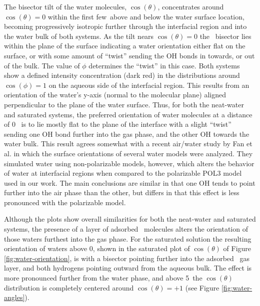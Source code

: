 \documentclass{article}
\begin{document}
The bisector tilt of the water molecules, $\cos(\theta)$, concentrates around $\cos(\theta)=0$ within the first few\angs~above and below the water surface location, becoming progressively isotropic further through the interfacial region and into the water bulk of both systems. As the tilt nears $\cos(\theta)=0$ the \wat~bisector lies within the plane of the surface indicating a water orientation either flat on the surface, or with some amount of ``twist'' sending the OH bonds in towards, or out of the bulk. The value of $\phi$ determines the ``twist'' in this case. Both systems show a defined intensity concentration (dark red) in the distributions around $\cos(\phi)=1$ on the aqueous side of the interfacial region. This results from an orientation of the water's y-axis (normal to the molecular plane) aligned perpendicular to the plane of the water surface. Thus, for both the neat-water and saturated systems, the preferred orientation of water molecules at a distance of 0\angs~ is to lie mostly flat to the plane of the interface with a slight ``twist'' sending one OH bond further into the gas phase, and the other OH towards the water bulk. This result agrees somewhat with a recent air/water study by Fan et al. in which the surface orientations of several water models were analyzed.\cite{Fan2009} They simulated water using non-polarizable models, however, which alters the behavior of water at interfacial regions when compared to the polarizable POL3 model used in our work. The main conclusions are similar in that one OH tends to point further into the air phase than the other, but differs in that this effect is less pronounced with the polarizable model.

Although the plots show overall similarities for both the neat-water and saturated systems, the presence of a layer of adsorbed \suldiox~molecules alters the orientation of those waters furthest into the gas phase. For the saturated solution the resulting orientation of waters above 0\angs, shown in the saturated plot of $\cos(\theta)$ of Figure \ref{fig:water-orientation}, is with a bisector pointing further into the adsorbed \suldiox~gas layer, and both hydrogens pointing outward from the aqueous bulk. The effect is more pronounced further from the water phase, and above 5\angs~the $\cos(\theta)$ distribution is completely centered around $\cos(\theta)=+1$ (see Figure \ref{fig:water-angles}).
\end{document}
